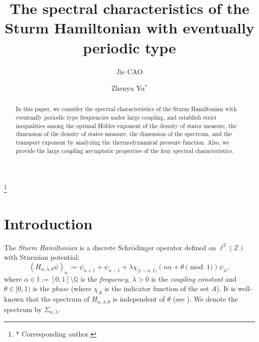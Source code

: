 \documentclass[reqno,11pt,graphicx,]{amsart}
\numberwithin{equation}{section}
\theoremstyle{plain}
\newcommand{\Z}{{\mathbb Z}}
\newcommand{\I}{{\mathbb I}}
\newcommand{\Q}{{\mathbb Q}}
\newcommand{\3}{\mathbf{3}}
\begin{document}
	\title{The spectral characteristics of the Sturm Hamiltonian with eventually periodic type}
	
	\author{Jie CAO}
	\address[J. Cao]{Chern Institute of Mathematics and LPMC, Nankai University, Tianjin 300071, P. R. China.}
	
	\author{Zhenyu Yu$^*$}
	\address[Z. Yu]{College of Science,
		National University of Defense Technology, Changsha 410073, P. R. China.}
	
	\thanks{* Corresponding author.}
	
	\begin{abstract}
		In this paper, we consider the spectral characteristics of the Sturm Hamiltonian with eventually periodic type frequencies under large coupling, and establish strict inequalities among the optimal Hölder exponent of the density of states measure, the dimension of the density of states measure, the dimension of the spectrum, and the transport exponent by analyzing the thermodynamical pressure function. Also, we provide the large coupling asymptotic properties of the four spectral characteristics.
	\end{abstract}
	
	\maketitle
	\section{Introduction}
	
	The {\it Sturm Hamiltonian} is a discrete Schr\"odinger operator defined on $\ell^2(\Z)$ with Sturmian potential:
	\begin{equation*}%
		(H_{\alpha,\lambda,\theta}\psi)_n:=\psi_{n+1}+\psi_{n-1}+\lambda \chi_{[1-\alpha,1)}(n\alpha+\theta\pmod 1)\psi_n,
	\end{equation*}
	where $\alpha\in\I:=[0,1]\setminus\Q$ is the {\it frequency}, $\lambda >0$ is the {\it coupling constant} and $\theta\in [0,1)$ is the {\it phase} (where $\chi_A$ is the indicator function of the set $A$). It is well-known that the spectrum of $H_{\alpha,\lambda,\theta}$ is independent of $\theta$ (see \cite{BIST1989}).
	We denote the spectrum by $\Sigma_{\alpha,\lambda}$.
	
\end{document}

